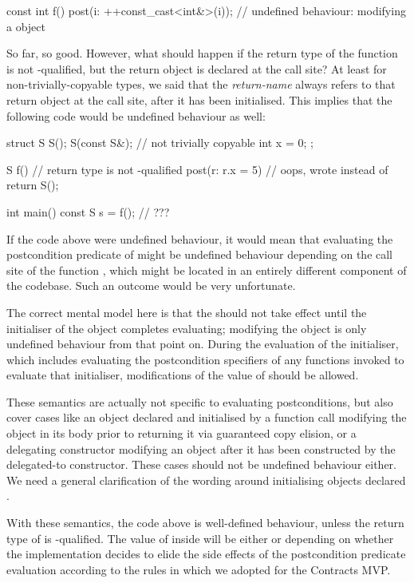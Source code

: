 \begin{codeblock}
const int f()
  post(i: ++const_cast<int&>(i));  // undefined behaviour: modifying a  object
\end{codeblock}

So far, so good. However, what should happen if the return type of the function is not -qualified, but the return object is declared  at the call site? At least for non-trivially-copyable types, we said that the \emph{return-name} always refers to that return object at the call site, after it has been initialised. This implies that the following code would be undefined behaviour as well:

\begin{codeblock}
struct S {
  S();
  S(const S&);      // not trivially copyable
  int x = 0;
};

S f()               // return type is not -qualified
  post(r: r.x = 5)  // oops, wrote \tcode{=} instead of \tcode{==}
{
  return S();
}

int main() {
  const S s = f();  // ???
}
\end{codeblock}

If the code above were undefined behaviour, it would mean that evaluating the postcondition predicate of  might be undefined behaviour depending on the call site of the function , which might be located in an entirely different component of the codebase. Such an outcome would be very unfortunate.

The correct mental model here is that the  should not take effect until the initialiser of the object completes evaluating; modifying the object is only undefined behaviour from that point on. During the evaluation of the initialiser, which includes evaluating the postcondition specifiers of any functions invoked to evaluate that initialiser, modifications of the value of  should be allowed.

These semantics are actually not specific to evaluating postconditions, but also cover cases like an object declared  and initialised by a function call modifying the object in its body prior to returning it via guaranteed copy elision, or a delegating constructor modifying an object after it has been constructed by the delegated-to constructor. These cases should not be undefined behaviour either. We need a general clarification of the wording around initialising objects declared .

With these semantics, the code above is well-defined behaviour, unless the return type of  is -qualified. The value of  inside  will be either  or  depending on whether the implementation decides to elide the side effects of the postcondition predicate evaluation according to the rules in \cite{P2751R1} which we adopted for the Contracts MVP.

